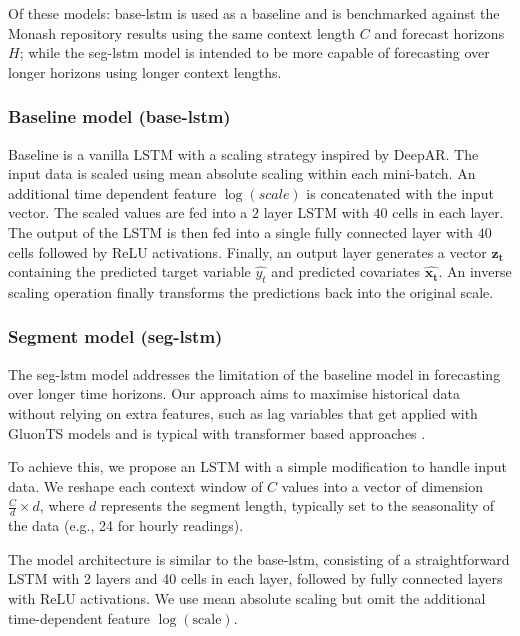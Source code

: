 \documentclass{article}
\newcommand{\horizon}{H}
\newcommand{\contextlength}{C}
\begin{document}
Of these models: base-lstm is used as a baseline and is benchmarked against the Monash repository results using the same context length $\contextlength$
and forecast horizons $\horizon$; while the seg-lstm model is intended to be more capable of forecasting over longer horizons using longer context lengths.

\subsubsection{Baseline model (base-lstm)}
Baseline is a vanilla LSTM with a scaling strategy inspired by DeepAR\cite{salinas2019deepar}.
The input data is scaled using mean absolute scaling within each mini-batch. An additional time dependent feature $\log(scale)$ is concatenated with the input vector. The scaled values are fed into a $2$ layer 
LSTM with $40$ cells in each layer. The output of the LSTM is then fed into a single fully connected layer 
with $40$ cells followed by ReLU activations. Finally, an output layer generates a vector $\mathbf{z_t}$ 
containing the predicted target variable $\hat{y_t}$ and predicted covariates $\mathbf{\hat{x_t}}$.  An inverse scaling operation finally transforms 
the predictions back into the original scale.

\subsubsection{Segment model (seg-lstm)}
The seg-lstm model addresses the limitation of the baseline model in forecasting over longer time horizons. 
Our approach aims to maximise historical data without relying on extra features, such as lag variables that get applied 
with GluonTS \cite{gluonts_arxiv} models and is typical with transformer based approaches \cite{zhou2021informer,wu2022autoformer,zhang2023crossformer,kitaev2020reformer}.

To achieve this, we propose an LSTM with a simple modification to handle input data. We reshape each context window of $\contextlength$ values 
into a vector of dimension $\frac{\contextlength}{d} \times d$, where $d$ represents the segment length, typically set to the seasonality
 of the data (e.g., 24 for hourly readings).

The model architecture is similar to the base-lstm, consisting of a straightforward LSTM with 2 layers and 40 cells in each layer, followed by fully connected 
layers with ReLU activations. We use mean absolute scaling but omit the additional time-dependent feature $\log(\text{scale})$.
\end{document}
